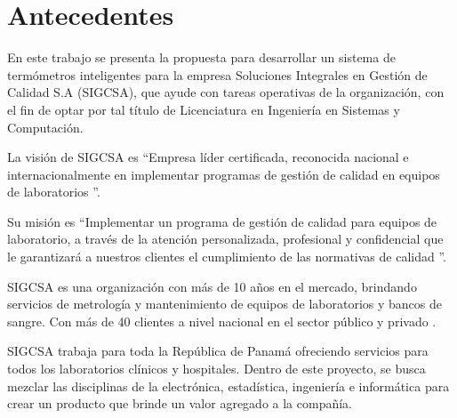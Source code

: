 \section{Antecedentes}

\par 
En este trabajo se presenta la propuesta para desarrollar un sistema de termómetros inteligentes para la empresa 			Soluciones Integrales en Gestión de Calidad S.A (SIGCSA), que 	ayude con tareas operativas de la organización, con el fin de 	optar por tal título de Licenciatura en Ingeniería en Sistemas y Computación.

\par  \noindent 
La visión de SIGCSA es \textquotedblleft Empresa líder certificada, reconocida nacional e internacionalmente en implementar programas de gestión de calidad en equipos de laboratorios \textquotedblright \cite{sigcsa-nosotros}.

\par \noindent
Su misión es \textquotedblleft Implementar un programa de gestión de calidad para equipos de laboratorio, a través de la atención personalizada, profesional y confidencial que le garantizará a nuestros clientes el cumplimiento de las normativas de calidad \textquotedblright \cite{sigcsa-nosotros}.

\par \noindent
SIGCSA es una organización con más de 10 años en el mercado, brindando servicios de metrología y mantenimiento de equipos de laboratorios y bancos de sangre. Con más de 40 clientes a nivel nacional en el sector público y privado \cite{sigcsa-nosotros}.

\par \noindent
SIGCSA trabaja para toda la República de Panamá ofreciendo servicios para todos los laboratorios clínicos y hospitales.
Dentro de este proyecto, se busca mezclar las disciplinas de la electrónica, estadística, ingeniería e informática para crear un producto que brinde un valor agregado a la compañía.

\clearpage